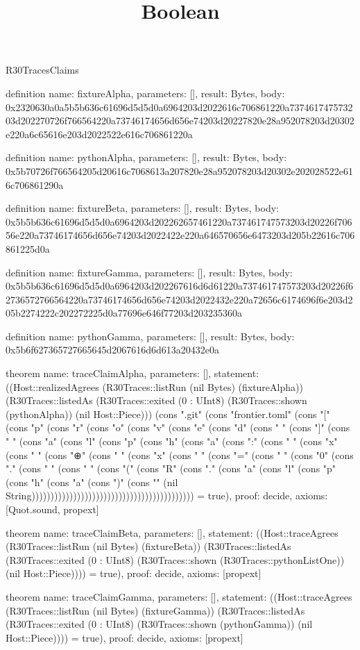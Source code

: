 \begin{lexlean}{R30TracesClaims}
\title{Boolean}
\begin{semanticmodule}
definition{
  name: fixtureAlpha,
  parameters: [],
  result: Bytes,
  body: 0x2320630a0a5b5b636c61696d5d5d0a6964203d2022616c706861220a737461747573203d202270726f766564220a73746174656d656e74203d20227820e28a952078203d20302e220a6c65616e203d2022522e616c706861220a
}

definition{
  name: pythonAlpha,
  parameters: [],
  result: Bytes,
  body: 0x5b70726f766564205d20616c7068613a207820e28a952078203d20302e202028522e616c706861290a
}

definition{
  name: fixtureBeta,
  parameters: [],
  result: Bytes,
  body: 0x5b5b636c61696d5d5d0a6964203d202262657461220a737461747573203d20226f70656e220a73746174656d656e74203d2022422e220a646570656e6473203d205b22616c706861225d0a
}

definition{
  name: fixtureGamma,
  parameters: [],
  result: Bytes,
  body: 0x5b5b636c61696d5d5d0a6964203d202267616d6d61220a737461747573203d20226f62736572766564220a73746174656d656e74203d2022432e220a72656c6174696f6e203d205b2274222c202272225d0a77696e646f77203d203235360a
}

definition{
  name: pythonGamma,
  parameters: [],
  result: Bytes,
  body: 0x5b6f627365727665645d2067616d6d613a20432e0a
}

theorem{
  name: traceClaimAlpha,
  parameters: [],
  statement: ((Host::realizedAgrees (R30Traces::listRun (nil Bytes) (fixtureAlpha)) (R30Traces::listedAs (R30Traces::exited (0 : UInt8) (R30Traces::shown (pythonAlpha)) (nil Host::Piece))) (cons ".git" (cons "frontier.toml" (cons "[" (cons "p" (cons "r" (cons "o" (cons "v" (cons "e" (cons "d" (cons " " (cons "]" (cons " " (cons "a" (cons "l" (cons "p" (cons "h" (cons "a" (cons ":" (cons " " (cons "x" (cons " " (cons "⊕" (cons " " (cons "x" (cons " " (cons "=" (cons " " (cons "0" (cons "." (cons " " (cons " " (cons "(" (cons "R" (cons "." (cons "a" (cons "l" (cons "p" (cons "h" (cons "a" (cons ")" (cons "\n" (nil String))))))))))))))))))))))))))))))))))))))))))) = true),
  proof: decide{},
  axioms: [Quot.sound, propext]
}

theorem{
  name: traceClaimBeta,
  parameters: [],
  statement: ((Host::traceAgrees (R30Traces::listRun (nil Bytes) (fixtureBeta)) (R30Traces::listedAs (R30Traces::exited (0 : UInt8) (R30Traces::shown (R30Traces::pythonListOne)) (nil Host::Piece)))) = true),
  proof: decide{},
  axioms: [propext]
}

theorem{
  name: traceClaimGamma,
  parameters: [],
  statement: ((Host::traceAgrees (R30Traces::listRun (nil Bytes) (fixtureGamma)) (R30Traces::listedAs (R30Traces::exited (0 : UInt8) (R30Traces::shown (pythonGamma)) (nil Host::Piece)))) = true),
  proof: decide{},
  axioms: [propext]
}
\end{semanticmodule}
\end{lexlean}
